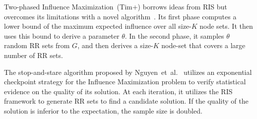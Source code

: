 \documentclass[final,5p,times,twocolumn]{elsarticle}
\newcommand\acro{{\sc{HyperFuseR\xspace}\xspace}\xspace}
\newcommand\fixme[1]{#1}
\begin{document}


Two-phased Influence Maximization~({\sc Tim+}) borrows ideas from RIS but overcomes its limitations with a novel algorithm~\cite{tim}. Its first phase computes a lower bound of the maximum expected influence over all size-$K$ node sets. It then uses this bound to derive a parameter $\theta$. In the second phase, it samples $\theta$ random RR sets from $G$, and then derives a size-$K$ node-set that covers a large number of RR sets.

The stop-and-stare algorithm proposed by Nguyen~et~al.~\cite{nguyen2016stop} utilizes an exponential checkpoint strategy for the Influence Maximization problem to verify statistical evidence on the quality of its solution. At each iteration, it utilizes the RIS framework to generate RR sets to find a candidate solution. If the quality of the solution is inferior to the expectation, the sample size is doubled.


\end{document}
